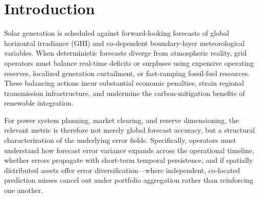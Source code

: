 
\section{Introduction}
\label{sec:intro}

Solar generation is scheduled against forward-looking forecasts of global horizontal irradiance (GHI) and co-dependent boundary-layer meteorological variables. When deterministic forecasts diverge from atmospheric reality, grid operators must balance real-time deficits or surpluses using expensive operating reserves, localized generation curtailment, or fast-ramping fossil-fuel resources. These balancing actions incur substantial economic penalties, strain regional transmission infrastructure, and undermine the carbon-mitigation benefits of renewable integration. 

For power system planning, market clearing, and reserve dimensioning, the relevant metric is therefore not merely global forecast accuracy, but a structural characterization of the underlying error fields. Specifically, operators must understand how forecast error variance expands across the operational timeline, whether errors propagate with short-term temporal persistence, and if spatially distributed assets offer error diversification—where independent, co-located prediction misses cancel out under portfolio aggregation rather than reinforcing one another.

